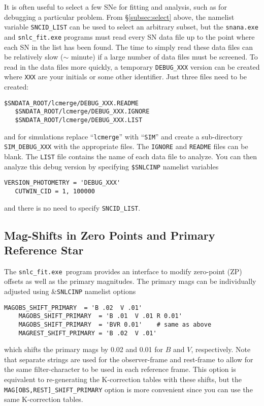 \documentclass[12pt]{article}
\newcommand{\snfitter}{{\tt snlc\_fit.exe}}
\begin{document}
It is often useful to select a few SNe for fitting and analysis, 
such as for debugging a particular problem. 
From \S\ref{subsec:select} above, the namelist variable
{\tt SNCID\_LIST} can be used to select an arbitrary subset,
but the {\tt snana.exe} and {\tt snlc\_fit.exe} programs
must read every SN data file up to the point where
each SN in the list has been found. The time to simply 
read these data files can be relatively slow ($\sim$ minute)
if a large number of data files must be screened.
To read in the data files more quickly,
a temporary {\tt DEBUG\_XXX} version
can be created where {\tt XXX} are your initials or some other
identifier. Just three files need to be created:
%
\begin{Verbatim}[frame=single]
   $SNDATA_ROOT/lcmerge/DEBUG_XXX.README
   $SNDATA_ROOT/lcmerge/DEBUG_XXX.IGNORE
   $SNDATA_ROOT/lcmerge/DEBUG_XXX.LIST
\end{Verbatim}
%
and for simulations replace ``{\tt lcmerge}''
with ``{\tt SIM}'' and create a sub-directory {\tt SIM\_DEBUG\_XXX}
with the appropriate files.
The {\tt IGNORE} and {\tt README} files can be blank.
The {\tt LIST} file contains the name of each data file
to analyze. You can then analyze this debug version by
specifying {\tt \$SNLCINP} namelist variables
\begin{Verbatim}[frame=single]
   VERSION_PHOTOMETRY = 'DEBUG_XXX'
   CUTWIN_CID = 1, 100000
\end{Verbatim}
%
and there is no need to specify {\tt SNCID\_LIST}.



   \subsection{Mag-Shifts in Zero Points and Primary Reference Star }
   \label{subsec:zpshifts}

The \snfitter\ program provides an interface to modify 
zero-point (ZP) offsets as well as the primary magnitudes.
The primary mags can be individually adjusted using 
\&{\tt SNLCINP} namelist options
%
\begin{Verbatim}[frame=single]
    MAGOBS_SHIFT_PRIMARY  = 'B .02  V .01'
    MAGOBS_SHIFT_PRIMARY  = 'B .01  V .01 R 0.01'
    MAGOBS_SHIFT_PRIMARY  = 'BVR 0.01'    # same as above
    MAGREST_SHIFT_PRIMARY = 'B .02  V .01'
\end{Verbatim}
%
which shifts the primary mags by 0.02 and 0.01 for $B$ and $V$,
respectively.
Note that separate strings are used for the
observer-frame and rest-frame to allow for the same 
filter-character to be used in each reference frame.
This option is equivalent to re-generating the
K-correction tables with these shifts, 
but the {\tt MAG[OBS,REST]\_SHIFT\_PRIMARY}
option is more convenient since you can use the same K-correction tables.
\end{document}
